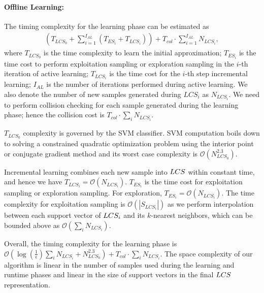 \paragraph{Offline Learning:} The timing complexity for the learning
phase can be estimated as
\begin{align} \label{eq:2:cost}
(T_{LCS_0} + \sum_{i=1}^{I_{AL}} (T_{ES_i} + T_{LCS_i})) + T_{col} \cdot \sum_{i=1}^{I_{AL}} N_{LCS_i},
\end{align}
where $T_{LCS_0}$ is the time complexity to learn the initial approximation;
$T_{ES_i}$ is the time cost to perform exploitation sampling or
exploration sampling in the $i$-th iteration of active learning;
$T_{LCS_i}$ is the time cost for the $i$-th step incremental
learning; $I_{AL}$ is the number of iterations performed during active
learning. We also denote the number of new samples generated
during $LCS_i$ as $N_{LCS_i}$. We need to perform collision checking for each sample generated during the learning phase; hence the collision cost is
$T_{col} \cdot \sum_i N_{LCS_i}$.

$T_{LCS_0}$ complexity is governed by the SVM classifier. SVM computation boils down
to solving a constrained quadratic optimization problem using the interior
point or conjugate gradient method and its worst case complexity
is $\mathcal O(N_{LCS_0}^{2.3})$.

Incremental learning combines each new sample into $LCS$ within
constant time, and hence we have $T_{LCS_i} = \mathcal
O(N_{LCS_i})$. $T_{ES_i}$ is the time cost for exploitation sampling
or exploration sampling. For exploration, $T_{ES_i} = \mathcal
O(N_{LCS_i})$. The time complexity for exploitation sampling is
$\mathcal O(|S_{LCS_i}|)$ as we perform interpolation between each
support vector of $LCS_i$ and its $k$-nearest neighbors, which can
be bounded above as $\mathcal O(\sum_i N_{LCS_i})$.

Overall, the timing complexity for the learning phase is
$\mathcal O(\log(\frac{1}{\epsilon}) \sum_i{N_{LCS_i}} +
N_{LCS_0}^{2.3}) + T_{col} \cdot \sum_i N_{LCS_i}$.
The space complexity of our algorithm is linear in the
number of samples used during the learning and runtime phases and linear in the size of support vectors in the final $LCS$ representation.

